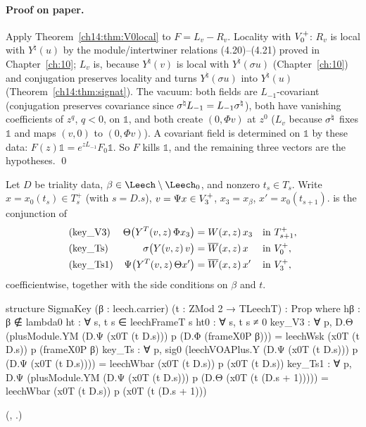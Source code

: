 \paragraph{Proof on paper.}  Apply Theorem~\ref{ch14:thm:V0local} to $F=L_v-R_v$.  Locality with
$V_0^{+}$: $R_v$ is local with $Y^\natural(u)$ by the module/intertwiner relations (4.20)--(4.21)
proved in Chapter~\ref{ch:10}; $L_v$ is, because $Y^\natural(v)$ is local with $Y^\natural(\sigma u)$
(Chapter~\ref{ch:10}) and conjugation preserves locality and turns $Y^\natural(\sigma u)$ into
$Y^\natural(u)$ (Theorem~\ref{ch14:thm:signat}).  The vacuum: both fields are $L_{-1}$-covariant
(conjugation preserves covariance since $\sigma^{\natural} L_{-1}=L_{-1}\sigma^{\natural}$), both have vanishing
coefficients of $z^{q}$, $q<0$, on $\mathbb 1$, and both create $(0,\Phi v)$ at $z^0$ ($L_v$ because $\sigma^{\natural}$ fixes $\mathbb 1$ and maps $(v,0)$ to $(0,\Phi v)$).
A covariant field is determined on $\mathbb 1$ by these data: $F(z)\mathbb 1=e^{zL_{-1}}F_0\mathbb 1$.
So $F$ kills $\mathbb 1$, and the remaining three vectors are the hypotheses. \qed

\begin{definition}\label{ch14:def:sigmakey}
Let $D$ be triality data, $\beta\in\Leech\setminus\Leech_0$, and nonzero $t_s\in T_s$.  Write
$x=x_0(t_s)\in T_s^+$ (with $s=D.s$), $v=\Psi x\in V_3^{+}$, $x_3=x_\beta$, $x'=x_0(t_{s+1})$.
 is the conjunction of
\begin{align*}
 &\text{(key\_V3)} & \Theta\bigl(Y^T(v,z)\,\Phi x_3\bigr)&=W(x,z)\,x_3 &&\text{in }T_{s+1}^+,\\
 &\text{(key\_Ts)} & \sigma\bigl(Y(v,z)\,v\bigr)&=\overline W(x,z)\,x &&\text{in }V_0^{+},\\
 &\text{(key\_Ts1)} & \Psi\bigl(Y^T(v,z)\,\Theta x'\bigr)&=\overline W(x,z)\,x' &&\text{in }V_3^{+},
\end{align*}
coefficientwise, together with the side conditions on $\beta$ and $t$.
\end{definition}
\begin{leancode}
structure SigmaKey (β : leech.carrier) (t : ZMod 2 → TLeechT) : Prop where
  hβ : β ∉ lambda0
  ht : ∀ s, t s ∈ leechFrameT s
  ht0 : ∀ s, t s ≠ 0
  key_V3 : ∀ p, D.Θ (plusModule.YM (D.Ψ (x0T (t D.s))) p (D.Φ (frameX0P β)))
    = leechWsk (x0T (t D.s)) p (frameX0P β)
  key_Ts : ∀ p, sig0 (leechVOAPlus.Y (D.Ψ (x0T (t D.s))) p (D.Ψ (x0T (t D.s))))
    = leechWbar (x0T (t D.s)) p (x0T (t D.s))
  key_Ts1 : ∀ p, D.Ψ (plusModule.YM (D.Ψ (x0T (t D.s))) p (D.Θ (x0T (t (D.s + 1)))))
    = leechWbar (x0T (t D.s)) p (x0T (t (D.s + 1)))
\end{leancode}
(, .)

